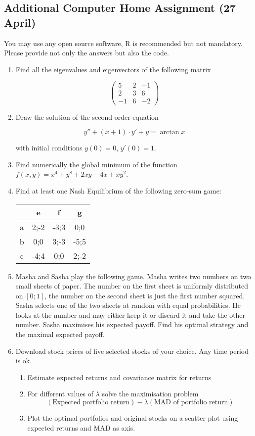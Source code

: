 \documentclass[12pt]{article} %
\theoremstyle{definition} %
\begin{document}
\newpage
\subsection*{Additional Computer Home Assignment (27 April)}

You may use any open source software, R is recommended but not mandatory. Please provide not only the answers but also the code.

\begin{enumerate}

\item Find all the eigenvalues and eigenvectors of the following matrix

\[
\begin{pmatrix}
5 & 2 & -1\\
2 & 3 & 6\\
-1 & 6 & -2
\end{pmatrix}
\]

\item Draw the solution of the second order equation

\[
y''+(x+1)\cdot y' + y=\arctan x
\]

with initial conditions $y(0)=0$, $y'(0)=1$.

\item Find numerically the global minimum of the function $f(x,y)=x^4+y^8+2xy-4x+xy^2$.

\item Find at least one Nash Equilibrium of the following zero-sum game:

\begin{tabular}{c|ccc}
 & e & f & g \\
\hline
a & 2;-2 & -3;3 & 0;0 \\
b & 0;0 & 3;-3 & -5;5 \\
c & -4;4 & 0;0 & 2;-2 \\
\end{tabular}

\item Masha and Sasha play the following game. Masha writes two numbers on two small sheets of paper. The number on the first sheet is uniformly distributed on $[0;1]$, the number on the second sheet is just the first number squared. Sasha selects one of the two sheets at random with equal probabilities. He looks at the number and may either keep it or discard it and take the other number. Sasha maximises his expected payoff. Find his optimal strategy and the maximal expected payoff.

\item Download stock prices of five selected stocks of your choice. Any time period is ok.

\begin{enumerate}
\item Estimate expected returns and covariance matrix for returns
\item For different values of $\lambda$ solve the maximisation problem
\[
(\text{Expected portfolio return}) - \lambda (\text{MAD of portfolio return})
\]
\item Plot the optimal portfolios and original stocks on a scatter plot using expected returns and MAD as axis.
\end{enumerate}
\end{enumerate}
\end{document}
